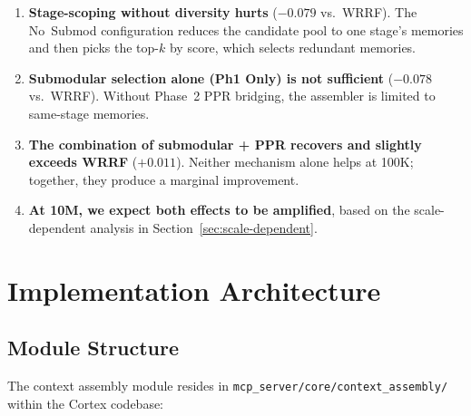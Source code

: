 \documentclass[11pt]{article}
\begin{document}
\begin{enumerate}
  \item \textbf{Stage-scoping without diversity hurts} ($-0.079$ vs.\
    WRRF).  The No~Submod configuration reduces the candidate pool to
    one stage's memories and then picks the top-$k$ by score, which
    selects redundant memories.

  \item \textbf{Submodular selection alone (Ph1 Only) is not
    sufficient} ($-0.078$ vs.\ WRRF).  Without Phase~2 PPR bridging,
    the assembler is limited to same-stage memories.

  \item \textbf{The combination of submodular + PPR recovers and
    slightly exceeds WRRF} ($+0.011$).  Neither mechanism alone helps
    at 100K; together, they produce a marginal improvement.

  \item \textbf{At 10M, we expect both effects to be amplified}, based
    on the scale-dependent analysis in Section~\ref{sec:scale-dependent}.
\end{enumerate}

\section{Implementation Architecture}
\label{app:implementation}

\subsection{Module Structure}

The context assembly module resides in
\texttt{mcp\_server/core/context\_assembly/} within the Cortex
codebase:
\end{document}
